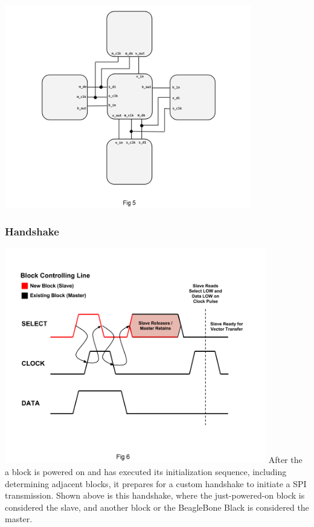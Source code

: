 \documentclass[12pt,a4paper]{article}
\begin{document}
 \includegraphics[width=4.25in]{BD.png}
 \subsubsection{Handshake}
 \includegraphics[width=4.5in]{HS.png}
 After the a block is powered on and has executed its initialization sequence, including determining adjacent blocks, it prepares for a custom handshake to initiate a SPI transmission. Shown above is this handshake, where the just-powered-on block is considered the slave, and another block or the BeagleBone Black is considered the master. 
 
\end{document}
